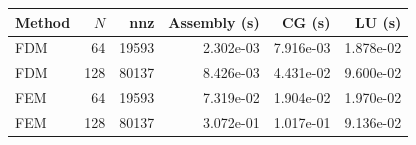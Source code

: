 \begin{tabular}{lrrrrr}
\toprule
Method & $N$ & nnz & Assembly (s) & CG (s) & LU (s)\\
\midrule
FDM & 64 & 19593 & 2.302e-03 & 7.916e-03 & 1.878e-02\\
FDM & 128 & 80137 & 8.426e-03 & 4.431e-02 & 9.600e-02\\
FEM & 64 & 19593 & 7.319e-02 & 1.904e-02 & 1.970e-02\\
FEM & 128 & 80137 & 3.072e-01 & 1.017e-01 & 9.136e-02\\
\bottomrule
\end{tabular}
